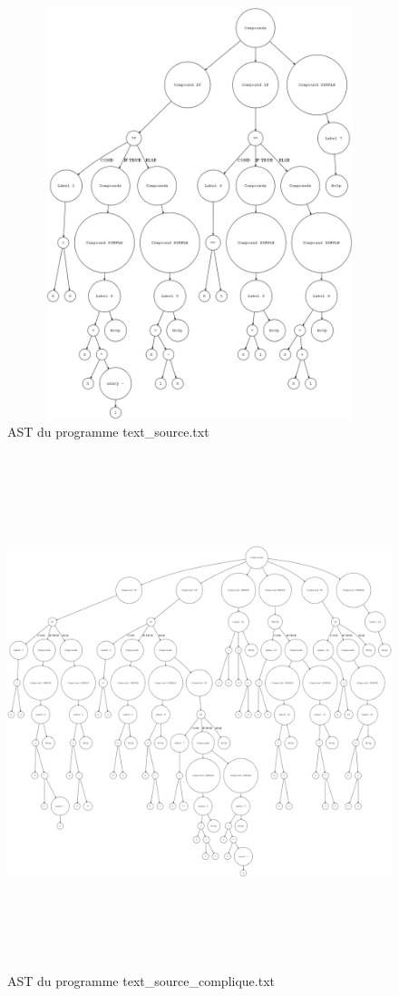 \documentclass[a4paper]{article}
\begin{document}
\begin{figure}[h!]
  \centering
  \includegraphics[width=12cm,height=12cm,keepaspectratio]{input/text_source_ast.png}
  \caption{AST du programme text\_source.txt}
  \label{fig:ast2}
\end{figure}

\begin{figure}[h!]
  \centering
  \includegraphics[width=15cm,height=15cm,keepaspectratio]{input/text_source_complique_ast.png}
  \caption{AST du programme text\_source\_complique.txt}
  \label{fig:ast3}
\end{figure}
\end{document}

